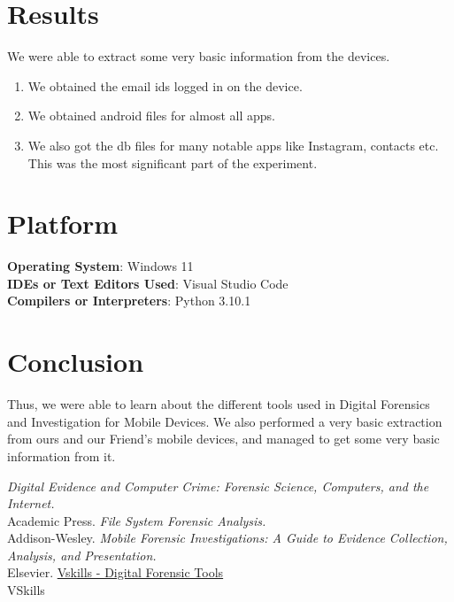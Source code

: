 \documentclass[11pt]{article}
\begin{document}
\section{Results}

We were able to extract some very basic information from the devices.

\begin{enumerate}
    \item We obtained the email ids logged in on the device.
    \item We obtained android files for almost all apps.
    \item We also got the db files for many notable apps like Instagram, contacts etc. This was the most significant part of the experiment.
\end{enumerate}


\section{Platform}
\textbf{Operating System}: Windows 11 \\
\textbf{IDEs or Text Editors Used}: Visual Studio Code\\
\textbf{Compilers or Interpreters}: Python 3.10.1\\

% 

\section{Conclusion}
Thus, we were able to learn about the different tools used in Digital Forensics and Investigation for Mobile Devices. We also performed a very basic extraction from ours and our Friend's mobile devices, and managed to get some very basic information from it.

\clearpage

\pagebreak
\begin{thebibliography}{}
    \textit{Digital Evidence and Computer Crime: Forensic Science, Computers, and the Internet.} \\Academic Press.
    \textit{File System Forensic Analysis.}
    \\Addison-Wesley.
    \textit{Mobile Forensic Investigations: A Guide to Evidence Collection, Analysis, and Presentation.} \\Elsevier.
    \href{https://www.vskills.in/certification/tutorial/digital-forensics-tools/}{Vskills - Digital Forensic Tools} \\VSkills
\end{thebibliography}
\end{document}
